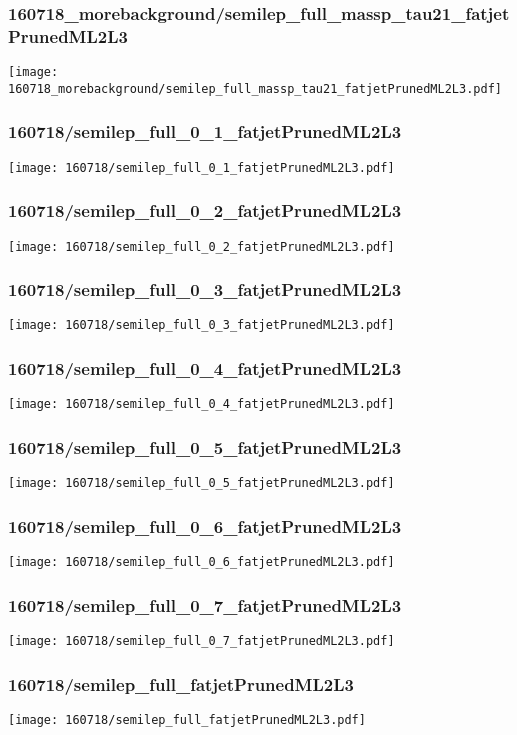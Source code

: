 \begin{frame}
   \frametitle{\small 160718\_morebackground/semilep\_full\_massp\_tau21\_fatjetPrunedML2L3}
   \centering
   \texttt{[image: 160718\_morebackground/semilep\_full\_massp\_tau21\_fatjetPrunedML2L3.pdf]}
\end{frame}

\begin{frame}
   \frametitle{\small 160718/semilep\_full\_0\_1\_fatjetPrunedML2L3}
   \centering
   \texttt{[image: 160718/semilep\_full\_0\_1\_fatjetPrunedML2L3.pdf]}
\end{frame}

\begin{frame}
   \frametitle{\small 160718/semilep\_full\_0\_2\_fatjetPrunedML2L3}
   \centering
   \texttt{[image: 160718/semilep\_full\_0\_2\_fatjetPrunedML2L3.pdf]}
\end{frame}

\begin{frame}
   \frametitle{\small 160718/semilep\_full\_0\_3\_fatjetPrunedML2L3}
   \centering
   \texttt{[image: 160718/semilep\_full\_0\_3\_fatjetPrunedML2L3.pdf]}
\end{frame}

\begin{frame}
   \frametitle{\small 160718/semilep\_full\_0\_4\_fatjetPrunedML2L3}
   \centering
   \texttt{[image: 160718/semilep\_full\_0\_4\_fatjetPrunedML2L3.pdf]}
\end{frame}

\begin{frame}
   \frametitle{\small 160718/semilep\_full\_0\_5\_fatjetPrunedML2L3}
   \centering
   \texttt{[image: 160718/semilep\_full\_0\_5\_fatjetPrunedML2L3.pdf]}
\end{frame}

\begin{frame}
   \frametitle{\small 160718/semilep\_full\_0\_6\_fatjetPrunedML2L3}
   \centering
   \texttt{[image: 160718/semilep\_full\_0\_6\_fatjetPrunedML2L3.pdf]}
\end{frame}

\begin{frame}
   \frametitle{\small 160718/semilep\_full\_0\_7\_fatjetPrunedML2L3}
   \centering
   \texttt{[image: 160718/semilep\_full\_0\_7\_fatjetPrunedML2L3.pdf]}
\end{frame}

\begin{frame}
   \frametitle{\small 160718/semilep\_full\_fatjetPrunedML2L3}
   \centering
   \texttt{[image: 160718/semilep\_full\_fatjetPrunedML2L3.pdf]}
\end{frame}

